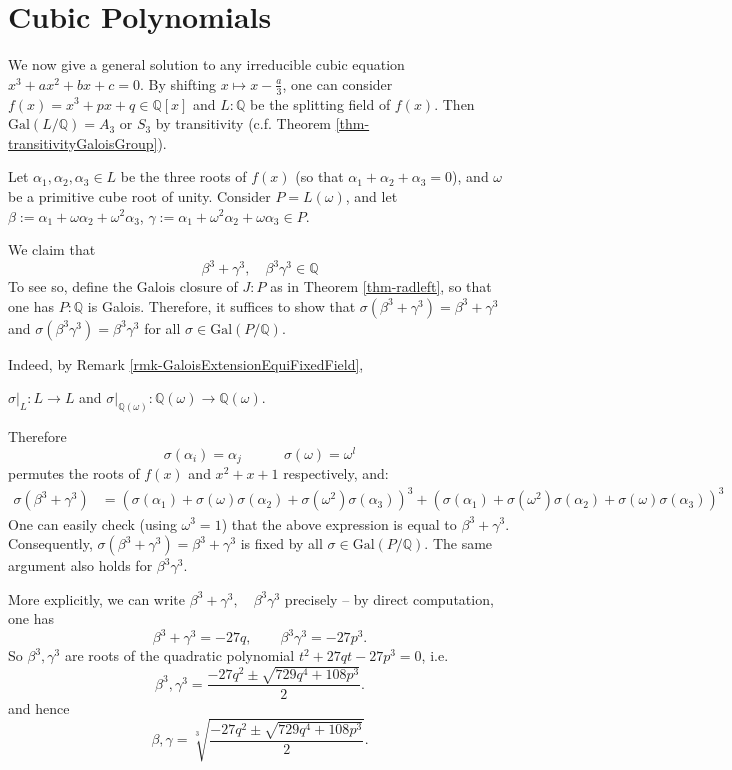 \documentclass[11pt]{book}
\begin{document}
\section{Cubic Polynomials}
We now give a general solution to any irreducible cubic equation $x^3 + ax^2 + bx+c = 0$. By shifting $x \mapsto x-\frac{a}{3}$, one can consider \( f(x) = x^3 + px + q \in \mathbb{Q}[x]\) and \( L:\mathbb{Q} \) be the splitting field of \( f(x) \). Then \( \text{Gal}(L/\mathbb{Q}) = A_3\) or \(S_3 \) by transitivity (c.f. Theorem \ref{thm-transitivityGaloisGroup}). 

Let $\alpha_1, \alpha_2, \alpha_3 \in L$ be the three roots of $f(x)$ (so that $\alpha_1+\alpha_2+\alpha_3 = 0$), and $\omega$ be a primitive cube root of unity.
Consider $P = L(\omega)$, and
let \( \beta := \alpha_1 + \omega \alpha_2 + \omega^2 \alpha_3 \), 
\( \gamma := \alpha_1 + \omega^2 \alpha_2 + \omega \alpha_3 \in P\).

We claim that
$$ \beta^3 + \gamma^3, \quad \beta^3\gamma^3 \in \mathbb{Q}$$ 
To see so, define the Galois closure of $J:P$ as in Theorem \ref{thm-radleft}, so that one has
$P:\mathbb{Q}$ is Galois. Therefore, it suffices to show that $\sigma(\beta^3+\gamma^3) = \beta^3+\gamma^3$ and $\sigma(\beta^3\gamma^3) = \beta^3\gamma^3$ for all $\sigma \in \mathrm{Gal}(P/\mathbb{Q})$.

Indeed, by Remark \ref{rmk-GaloisExtensionEquiFixedField},
\begin{center}
$\sigma|_L: L \to L$ \quad and \quad $\sigma|_{\mathbb{Q}(\omega)}:\mathbb{Q}(\omega) \to \mathbb{Q}(\omega)$.
\end{center}
Therefore
$$\sigma(\alpha_i) = \alpha_j \quad \quad \quad  \sigma(\omega)=\omega^l$$
permutes the roots of $f(x)$ and $x^2+x+1$ respectively, and:
\begin{align*}
\sigma(\beta^3 + \gamma^3) &= (\sigma(\alpha_1) + \sigma(\omega) \sigma(\alpha_2) + \sigma(\omega^2) \sigma(\alpha_3))^3 + 
(\sigma(\alpha_1) + \sigma(\omega^2) \sigma(\alpha_2) + \sigma(\omega) \sigma(\alpha_3))^3    
\end{align*}
One can easily check (using $\omega^3 = 1$) that the above expression is equal to $\beta^3 + \gamma^3$. Consequently, $\sigma(\beta^3 + \gamma^3) = \beta^3 + \gamma^3$ is fixed by all $\sigma \in \mathrm{Gal}(P/\mathbb{Q})$. The same argument also holds for $\beta^3 \gamma^3$.

\medskip
More explicitly, we can write $\beta^3 + \gamma^3, \quad \beta^3\gamma^3$ precisely -- by direct computation, one has
$$\beta^3 + \gamma^3 = -27q, \quad \quad \beta^3 \gamma^3 = -27p^3.$$
So $\beta^3, \gamma^3$ are roots of the quadratic polynomial $t^2 + 27qt -27p^3 = 0$, i.e.
$$ \beta^3, \gamma^3 = \frac{-27q^2 \pm \sqrt{729q^4 + 108p^3}}{2}. $$
and hence
$$ \beta, \gamma = \sqrt[3]{\frac{-27q^2 \pm \sqrt{729q^4 + 108p^3}}{2}}. $$
\end{document}

